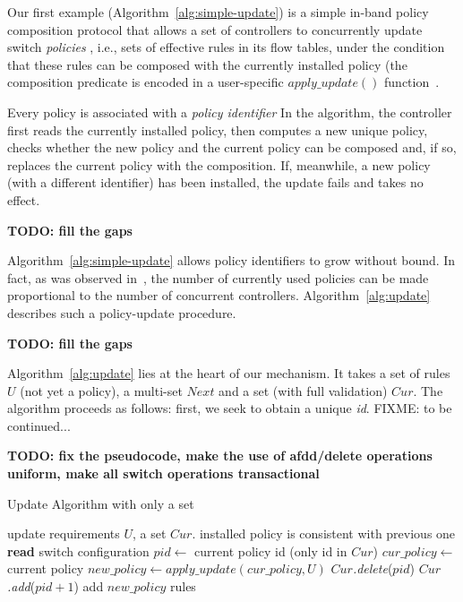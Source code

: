 \documentclass[conference]{sigcomm-alternate}
\begin{document}
Our first example (Algorithm~\ref{alg:simple-update}) is a simple in-band policy composition protocol that
allows a set of  controllers to concurrently update switch  \emph{policies} , i.e., sets of
effective rules in its flow tables, under the
condition that these rules can be composed with the currently installed
policy (the composition predicate is encoded in a user-specific
$\textit{apply\_update}()$ function~\cite{cpc}.  

Every policy is associated with a \emph{policy identifier} 
In the algorithm, the controller first reads the currently installed
policy, then computes a new unique policy, checks whether the new
policy and the current policy can be composed and, if so, replaces the
current policy with the composition. If, meanwhile, a new
policy (with a different identifier) has been installed, the update
fails and takes no effect.  

\textbf{TODO: fill the gaps}

Algorithm~\ref{alg:simple-update} allows policy identifiers to grow
without bound. In fact, as was observed in~\cite{cpc}, the number of currently
used policies can be made proportional to the number of concurrent controllers.
Algorithm~\ref{alg:update} describes such a policy-update procedure.
 
\textbf{TODO: fill the gaps}



Algorithm~\ref{alg:update} lies at the heart of our mechanism.
It takes a set of rules $U$ (not yet a policy),
a multi-set $Next$ and a set (with full validation) $Cur$.
The algorithm proceeds as follows: first, we seek to
obtain a unique \emph{id}. FIXME: to be continued...

\textbf{TODO: fix the pseudocode, make the use of afdd/delete
  operations uniform, make all switch operations transactional}



\begin{algorithm}[t]
    \caption{Update Algorithm with only a set}
    \label{alg:simple-update}
    \begin{algorithmic}[1]
    \Require update requirements $U$, a set $Cur$.
    \Ensure installed policy is consistent with previous one
 		\Repeat
 			\State \textbf{read} switch configuration
 			\State $pid\gets$ current policy id (only id in $Cur$)
 			\State $cur\_policy\gets$ current policy
 			\State $new\_policy\gets apply\_update(cur\_policy,U)$
 			\startTransaction
	 			\State $Cur$\emph{.delete}($pid$)
	 			\State $Cur$\emph{.add}($pid+1$)
	 			\State add $new\_policy$ rules %
 			\endTransaction
			\Return

    \end{algorithmic}
\end{algorithm}
\end{document}
